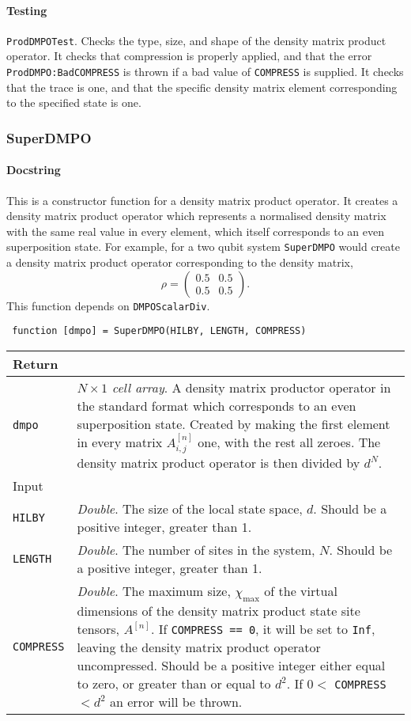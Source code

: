  \paragraph{Testing} \lstinline$ProdDMPOTest$. Checks the type, size, and shape of the density matrix product operator. It checks that compression is properly applied, and that the error \lstinline$ProdDMPO:BadCOMPRESS$ is thrown if a bad value of \lstinline$COMPRESS$ is supplied. It checks that the trace is one, and that the specific density matrix element corresponding to the specified state is one.
 
 \subsubsection{SuperDMPO}
 \paragraph{Docstring} This is a constructor function for a density matrix product operator. It creates a density matrix product operator which represents a normalised density matrix with the same real value in every element, which itself corresponds to an even superposition state. For example, for a two qubit system \lstinline$SuperDMPO$ would create a density matrix product operator corresponding to the density matrix,
 \begin{equation}
 \rho = \begin{pmatrix}
 0.5 & 0.5 \\
 0.5 & 0.5 \end{pmatrix}.
 \label{eq:vs3-4}
 \end{equation} 
 This function depends on \lstinline$DMPOScalarDiv$.
 \begin{lstlisting}
 function [dmpo] = SuperDMPO(HILBY, LENGTH, COMPRESS) \end{lstlisting}
 \begin{longtabu}{X[1,l]X[4,l]}
 \hline
 Return & \\ \hline
 \lstinline$dmpo$ & \emph{\(N \times 1\) cell array}. A density matrix productor operator in the standard format which corresponds to an even superposition state. Created by making the first element in every matrix \(A^{[n]}_{i,j}\) one, with the rest all zeroes. The density matrix product operator is then divided by \(d^{N}\).  \\ \hline
 Input & \\ \hline
 \lstinline$HILBY$ & \emph{Double}. The size of the local state space, \(d\). Should be a positive integer, greater than 1. \\
 \lstinline$LENGTH$ & \emph{Double}. The number of sites in the system, \(N\). Should be a positive integer, greater than 1. \\
 \lstinline$COMPRESS$ & \emph{Double}. The maximum size, \(\chi_{\mathrm{max}}\) of the virtual dimensions of the density matrix product state site tensors, \(A^{[n]}\). If \lstinline$COMPRESS == 0$, it will be set to \lstinline$Inf$, leaving the density matrix product operator uncompressed. Should be a positive integer either equal to zero, or greater than or equal to \(d^{2}\). If \(0 <\) \lstinline$COMPRESS$ \(< d^{2}\) an error will be thrown. \\
 \hline
 \end{longtabu}  
